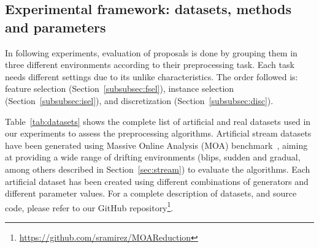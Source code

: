 \documentclass[preprint,12pt]{elsarticle}
\begin{document}
\subsection{Experimental framework: datasets, methods and parameters}

In following experiments, evaluation of proposals is done by grouping them in three different environments according to their preprocessing task. Each task needs different settings due to its unlike characteristics. The order followed is: feature selection (Section~\ref{subsubsec:fsel}), instance selection (Section~\ref{subsubsec:isel}), and discretization (Section~\ref{subsubsec:disc}).

Table~\ref{tab:datasets} shows the complete list of artificial and real datasets used in our experiments to assess the preprocessing algorithms. Artificial stream datasets have been generated using Massive Online Analysis (MOA) benchmark~\cite{bifet10}, aiming at providing a wide range of drifting environments (blips, sudden and gradual, among others described in Section~\ref{sec:stream}) to evaluate the algorithms. Each artificial dataset has been created using different combinations of generators and different parameter values. For a complete description of datasets, and source code, please refer to our GitHub repository\footnote{\url{https://github.com/sramirez/MOAReduction}}. 
\end{document}
